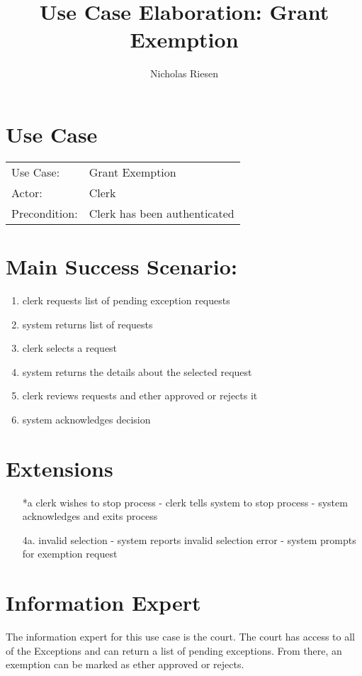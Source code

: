 \documentclass{article}
\title{Use Case Elaboration: Grant Exemption}
\author{Nicholas Riesen}
\begin{document}
\maketitle

\section*{Use Case}
\begin{tabular}{l l}
  Use Case:     & Grant Exemption              \\
  Actor:        & Clerk                        \\
  Precondition: & Clerk has been authenticated \\
\end{tabular}

\section*{Main Success Scenario:}
\begin{enumerate}
  \item clerk requests list of pending exception requests
  \item system returns list of requests
  \item clerk selects a request 
  \item system returns the details about the selected request
  \item clerk reviews requests and ether approved or rejects it
  \item system acknowledges decision 
\end{enumerate}

\section*{Extensions}
\begin{itemize}
  \item[*a] clerk wishes to stop process
        - clerk tells system to stop process
        - system acknowledges and exits process
  \item [4a.] invalid selection
        - system reports invalid selection error
        - system prompts for exemption request

\end{itemize}

\section*{Information Expert}
The information expert for this use case is the court. The court has access to all of the Exceptions and can return a list of pending exceptions. From there, an exemption can be marked as ether approved or rejects.
\end{document}
